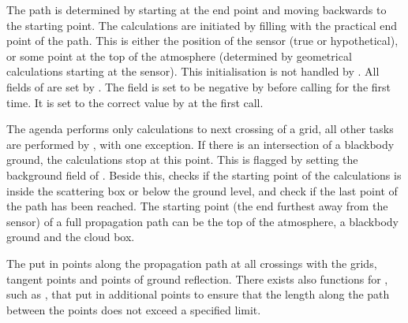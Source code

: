 The path is determined by starting at the end point and moving
backwards to the starting point. The calculations are initiated by
filling  with the practical end point of the
path.  This is either the position of the sensor (true or
hypothetical), or some point at the top of the atmosphere (determined
by geometrical calculations starting at the sensor). This
initialisation is not handled by . All
fields of  are set by
. The field  is set
to be negative by  before calling
 for the first time. It is set to the
correct value by  at the first call.

The agenda performs only calculations to next crossing of a grid, all
other tasks are performed by , with one exception.
If there is an intersection of a blackbody ground, the calculations
stop at this point. This is flagged by setting the background field of
. Beside this,  checks
if the starting point of the calculations is inside the scattering box
or below the ground level, and check if the last point of the path has
been reached. The starting point (the end furthest away from the
sensor) of a full propagation path can be the top of the atmosphere, a
blackbody ground and the cloud box.

The  put in points along the
propagation path at all crossings with the grids, tangent points and
points of ground reflection. There exists also functions for
, such as
, that put in additional
points to ensure that the length along the path between the points
does not exceed a specified limit.



\label{sec:ppath:Ppath}

